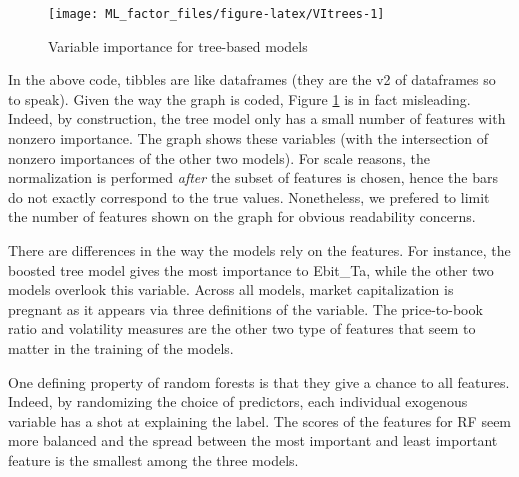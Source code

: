 \documentclass[]{krantz}
\makeatletter
\newenvironment{Shaded}{\begin{snugshade}}{\end{snugshade}}
\newcommand{\DataTypeTok}[1]{\textcolor[rgb]{0.27,0.27,0.27}{#1}}
\newcommand{\DecValTok}[1]{\textcolor[rgb]{0.06,0.06,0.06}{#1}}
\newcommand{\KeywordTok}[1]{\textcolor[rgb]{0.27,0.27,0.27}{\textbf{#1}}}
\newcommand{\NormalTok}[1]{#1}
\newcommand{\OperatorTok}[1]{\textcolor[rgb]{0.43,0.43,0.43}{\textbf{#1}}}
\newcommand{\StringTok}[1]{\textcolor[rgb]{0.5,0.5,0.5}{#1}}
\newenvironment{kframe}{%
\medskip{}
\setlength{\fboxsep}{.8em}
 \def\at@end@of@kframe{}%
 \ifinner\ifhmode%
  \def\at@end@of@kframe{\end{minipage}}%
  \begin{minipage}{\columnwidth}%
 \fi\fi%
 \def\FrameCommand##1{\hskip\@totalleftmargin \hskip-\fboxsep
 \colorbox{shadecolor}{##1}\hskip-\fboxsep
     \hskip-\linewidth \hskip-\@totalleftmargin \hskip\columnwidth}%
 \MakeFramed {\advance\hsize-\width
   \@totalleftmargin\z@ \linewidth\hsize
   \@setminipage}}%
 {\par\unskip\endMakeFramed%
 \at@end@of@kframe}
\renewenvironment{Shaded}{\begin{kframe}}{\end{kframe}}
\theoremstyle{definition}
\theoremstyle{definition}
\theoremstyle{definition}
\theoremstyle{remark}
\makeatother
\begin{document}
\begin{Shaded}
\begin{Highlighting}[]
{{{{{{\StringTok{    }\KeywordTok{gather}\NormalTok{(}\DataTypeTok{key =}\NormalTok{ model, }\DataTypeTok{value =}\NormalTok{ value, }\OperatorTok{-}\NormalTok{Feature) }\OperatorTok{%
\StringTok{    }\KeywordTok{ggplot}\NormalTok{(}\KeywordTok{aes}\NormalTok{(}\DataTypeTok{x =}\NormalTok{ Feature, }\DataTypeTok{y =}\NormalTok{ value, }\DataTypeTok{fill =}\NormalTok{ model)) }\OperatorTok{+}\StringTok{ }\KeywordTok{geom_col}\NormalTok{(}\DataTypeTok{position =} \StringTok{"dodge"}\NormalTok{) }\OperatorTok{+}
\StringTok{    }\KeywordTok{theme}\NormalTok{(}\DataTypeTok{axis.text.x =} \KeywordTok{element_text}\NormalTok{(}\DataTypeTok{angle =} \DecValTok{35}\NormalTok{, }\DataTypeTok{hjust =} \DecValTok{1}\NormalTok{))}
\end{Highlighting}
\end{Shaded}

\begin{figure}[H]

{\centering \texttt{[image: ML\_factor\_files/figure-latex/VItrees-1]} 

}

\caption{Variable importance for tree-based models}\label{fig:VItrees}
\end{figure}

\normalsize

In the above code, tibbles are like dataframes (they are the v2 of
dataframes so to speak). Given the way the graph is coded, Figure
\ref{fig:VItrees} is in fact misleading. Indeed, by construction, the
tree model only has a small number of features with nonzero importance.
The graph shows these variables (with the intersection of nonzero
importances of the other two models). For scale reasons, the
normalization is performed \emph{after} the subset of features is
chosen, hence the bars do not exactly correspond to the true values.
Nonetheless, we prefered to limit the number of features shown on the
graph for obvious readability concerns.

There are differences in the way the models rely on the features. For
instance, the boosted tree model gives the most importance to Ebit\_Ta,
while the other two models overlook this variable. Across all models,
market capitalization is pregnant as it appears via three definitions of
the variable. The price-to-book ratio and volatility measures are the
other two type of features that seem to matter in the training of the
models.

One defining property of random forests is that they give a chance to
all features. Indeed, by randomizing the choice of predictors, each
individual exogenous variable has a shot at explaining the label. The
scores of the features for RF seem more balanced and the spread between
the most important and least important feature is the smallest among the
three models.
\end{document}
